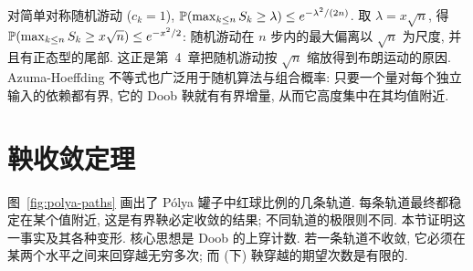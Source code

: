 \begin{example}\label{ex:azuma}
对简单对称随机游动 ($c_k=1$), $\P(\max_{k\le n}S_k\ge\lambda)\le e^{-\lambda^2/(2n)}$. 取 $\lambda=x\sqrt{n}$, 得 $\P(\max_{k\le n}S_k\ge x\sqrt{n})\le e^{-x^2/2}$: 随机游动在 $n$ 步内的最大偏离以 $\sqrt{n}$ 为尺度, 并且有正态型的尾部. 这正是第~4~章把随机游动按 $\sqrt{n}$ 缩放得到布朗运动的原因. Azuma-Hoeffding 不等式也广泛用于随机算法与组合概率: 只要一个量对每个独立输入的依赖都有界, 它的 Doob 鞅就有有界增量, 从而它高度集中在其均值附近.
\end{example}

\section{鞅收敛定理}
\label{sec:3-4}

图~\ref{fig:polya-paths} 画出了 P\'olya 罐子中红球比例的几条轨道. 每条轨道最终都稳定在某个值附近, 这是有界鞅必定收敛的结果; 不同轨道的极限则不同. 本节证明这一事实及其各种变形. 核心思想是 Doob 的上穿计数. 若一条轨道不收敛, 它必须在某两个水平之间来回穿越无穷多次; 而 (下) 鞅穿越的期望次数是有限的.

